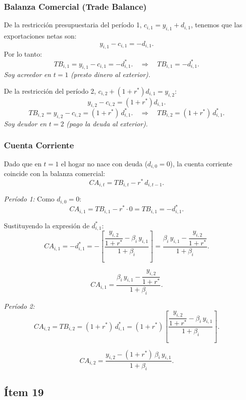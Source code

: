 \subsubsection*{Balanza Comercial (Trade Balance)}

De la restricción presupuestaria del período 1,
$c_{i,1} = y_{i,1} + d_{i,1}$, tenemos que las exportaciones netas son:
\[
    y_{i,1} - c_{i,1} = -d_{i,1}.
\]
Por lo tanto:
\[
    TB_{i,1} = y_{i,1} - c_{i,1} = -d_{i,1}^*.
    \quad\Longrightarrow\quad \boxed{TB_{i,1} = -d_{i,1}^*.}
\]
\textit{Soy acreedor en $t=1$ (presto dinero al exterior).}

De la restricción del período 2,
$c_{i,2} + (1+r^*)d_{i,1} = y_{i,2}$:
\[
    y_{i,2} - c_{i,2} = (1+r^*)d_{i,1}.
\]
\[
    TB_{i,2} = y_{i,2} - c_{i,2} = (1+r^*)\,d_{i,1}^*.
    \quad\Longrightarrow\quad \boxed{TB_{i,2} = (1+r^*)\,d_{i,1}^*.}
\]
\textit{Soy deudor en $t=2$ (pago la deuda al exterior).}

\subsubsection*{Cuenta Corriente}

Dado que en $t=1$ el hogar no nace con deuda ($d_{i,0}=0$), la cuenta
corriente coincide con la balanza comercial:
\[
    CA_{i,t} = TB_{i,t} - r^*\,d_{i,t-1}.
\]

\textit{Período 1:} Como $d_{i,0}=0$:
\[
    CA_{i,1} = TB_{i,1} - r^*\cdot 0 = TB_{i,1} = -d_{i,1}^*.
\]

Sustituyendo la expresión de $d_{i,1}^*$:
\[
    CA_{i,1} = -d_{i,1}^* = -\left[\frac{\dfrac{y_{i,2}}{1+r^*} - \beta_i\,y_{i,1}}{1+\beta_i}\right]
    = \frac{\beta_i\,y_{i,1} - \dfrac{y_{i,2}}{1+r^*}}{1+\beta_i}.
\]

\begin{resultado}
\[
    CA_{i,1} = \frac{\beta_i\,y_{i,1} - \dfrac{y_{i,2}}{1+r^*}}{1+\beta_i}.
\]
\end{resultado}

\textit{Período 2:}
\[
    CA_{i,2} = TB_{i,2} = (1+r^*)\,d_{i,1}^*
    = (1+r^*)\left[\frac{\dfrac{y_{i,2}}{1+r^*} - \beta_i\,y_{i,1}}{1+\beta_i}\right].
\]

\begin{resultado}
\[
    CA_{i,2} = \frac{y_{i,2} - (1+r^*)\,\beta_i\,y_{i,1}}{1+\beta_i}.
\]
\end{resultado}

\subsection*{Ítem 19}

